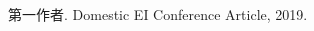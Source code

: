 \begin{publications}{99}
    \item\textsc{第一作者}. {Domestic EI Conference Article}, 2019.
\end{publications}


